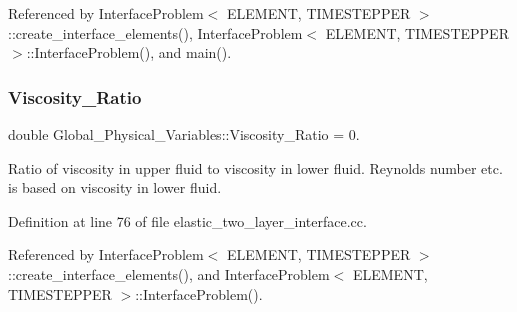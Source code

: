 Referenced by Interface\+Problem$<$ E\+L\+E\+M\+E\+N\+T, T\+I\+M\+E\+S\+T\+E\+P\+P\+E\+R $>$\+::create\+\_\+interface\+\_\+elements(), Interface\+Problem$<$ E\+L\+E\+M\+E\+N\+T, T\+I\+M\+E\+S\+T\+E\+P\+P\+E\+R $>$\+::\+Interface\+Problem(), and main().

\mbox{\label{namespaceGlobal__Physical__Variables_adb51428300a01b19395c43c0d3586d6f}} 
\subsubsection{\texorpdfstring{Viscosity\+\_\+\+Ratio}{Viscosity\_Ratio}}
{\footnotesize\ttfamily double Global\+\_\+\+Physical\+\_\+\+Variables\+::\+Viscosity\+\_\+\+Ratio = 0.}



Ratio of viscosity in upper fluid to viscosity in lower fluid. Reynolds number etc. is based on viscosity in lower fluid. 



Definition at line 76 of file elastic\+\_\+two\+\_\+layer\+\_\+interface.\+cc.



Referenced by Interface\+Problem$<$ E\+L\+E\+M\+E\+N\+T, T\+I\+M\+E\+S\+T\+E\+P\+P\+E\+R $>$\+::create\+\_\+interface\+\_\+elements(), and Interface\+Problem$<$ E\+L\+E\+M\+E\+N\+T, T\+I\+M\+E\+S\+T\+E\+P\+P\+E\+R $>$\+::\+Interface\+Problem().

